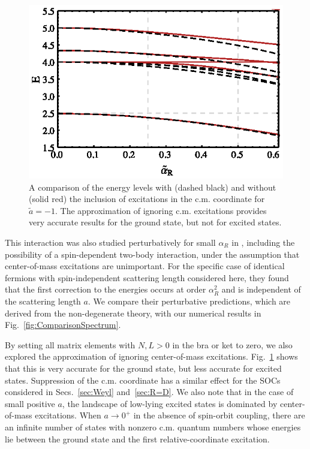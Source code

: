 \begin{figure}
\centering
\includegraphics[scale=1.2]{SOC/Figures/ComparisonNoCM}
\caption[Effect of neglecting center of mass excitations for Rashba spin-orbit coupling]{\label{fig:ComparisonSpectrum2}  A comparison of the energy levels with (dashed black) and without (solid red) the inclusion of excitations in the c.m. coordinate for $\tilde{a}=-1$. The approximation of ignoring c.m. excitations provides very accurate results for the ground state, but not for excited states.} 
\end{figure}


This interaction was also studied perturbatively for small $\alpha_R$ in \cite{PhysRevA.89.033606}, including the possibility of a spin-dependent two-body interaction, under the assumption that center-of-mass excitations are unimportant. For the specific case of identical fermions with spin-independent scattering length considered here, they found that the first correction to the energies occurs at order $\alpha_R^2$ and is independent of the scattering length $a$. We compare their perturbative predictions, which are derived from the non-degenerate theory, with our numerical results in Fig.~\ref{fig:ComparisonSpectrum}. 

By setting all matrix elements with $N,L>0$ in the bra or ket to zero, we also explored the approximation of ignoring center-of-mass excitations. Fig.~\ref{fig:ComparisonSpectrum2} shows that this is very accurate for the ground state, but less accurate for excited states. Suppression of the c.m. coordinate has a similar effect for the SOCs considered in Secs.~\ref{sec:Weyl} and~\ref{sec:R=D}. We also note that in the case of small positive $a$, the landscape of low-lying excited states is dominated by center-of-mass excitations. When $a\rightarrow0^+$ in the absence of spin-orbit coupling, there are an infinite number of states with nonzero c.m. quantum numbers whose energies lie between the ground state and the first relative-coordinate excitation.


